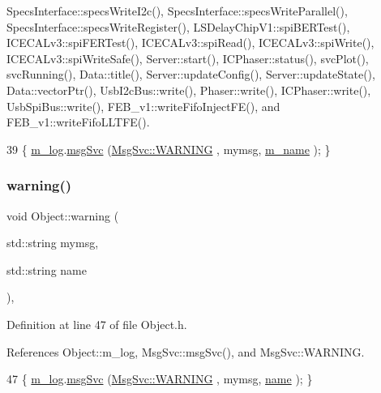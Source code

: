 Specs\+Interface\+::specs\+Write\+I2c(), Specs\+Interface\+::specs\+Write\+Parallel(), Specs\+Interface\+::specs\+Write\+Register(), L\+S\+Delay\+Chip\+V1\+::spi\+B\+E\+R\+Test(), I\+C\+E\+C\+A\+Lv3\+::spi\+F\+E\+R\+Test(), I\+C\+E\+C\+A\+Lv3\+::spi\+Read(), I\+C\+E\+C\+A\+Lv3\+::spi\+Write(), I\+C\+E\+C\+A\+Lv3\+::spi\+Write\+Safe(), Server\+::start(), I\+C\+Phaser\+::status(), svc\+Plot(), svc\+Running(), Data\+::title(), Server\+::update\+Config(), Server\+::update\+State(), Data\+::vector\+Ptr(), Usb\+I2c\+Bus\+::write(), Phaser\+::write(), I\+C\+Phaser\+::write(), Usb\+Spi\+Bus\+::write(), F\+E\+B\+\_\+v1\+::write\+Fifo\+Inject\+F\+E(), and F\+E\+B\+\_\+v1\+::write\+Fifo\+L\+L\+T\+F\+E().


\begin{DoxyCode}
39 \{ \hyperlink{classObject_a0d269813dd7ac1f24bc143031e2963f2}{m\_log}.\hyperlink{classMsgSvc_ad25f18047920cc59a314e5098259711c}{msgSvc} (\hyperlink{classMsgSvc_ae671eb7301996cd049d2da8a65925926a7cefae88f2ba26b2b05b676a383c834b}{MsgSvc::WARNING} , mymsg, \hyperlink{classObject_a8b83c95c705d2c3ba0d081fe1710f48d}{m\_name} ); \}
\end{DoxyCode}
\mbox{\label{classObject_a11f101db4dd73d9391b0231818881d86}} 
\subsubsection{\texorpdfstring{warning()}{warning()}\hspace{0.1cm}{\footnotesize\ttfamily [2/2]}}
{\footnotesize\ttfamily void Object\+::warning (\begin{DoxyParamCaption}\item[{std\+::string}]{mymsg,  }\item[{std\+::string}]{name }\end{DoxyParamCaption})\hspace{0.3cm}{\ttfamily [inline]}, {\ttfamily [inherited]}}



Definition at line 47 of file Object.\+h.



References Object\+::m\+\_\+log, Msg\+Svc\+::msg\+Svc(), and Msg\+Svc\+::\+W\+A\+R\+N\+I\+NG.


\begin{DoxyCode}
47 \{ \hyperlink{classObject_a0d269813dd7ac1f24bc143031e2963f2}{m\_log}.\hyperlink{classMsgSvc_ad25f18047920cc59a314e5098259711c}{msgSvc} (\hyperlink{classMsgSvc_ae671eb7301996cd049d2da8a65925926a7cefae88f2ba26b2b05b676a383c834b}{MsgSvc::WARNING} , mymsg, \hyperlink{classObject_a300f4c05dd468c7bb8b3c968868443c1}{name} ); \}
\end{DoxyCode}


